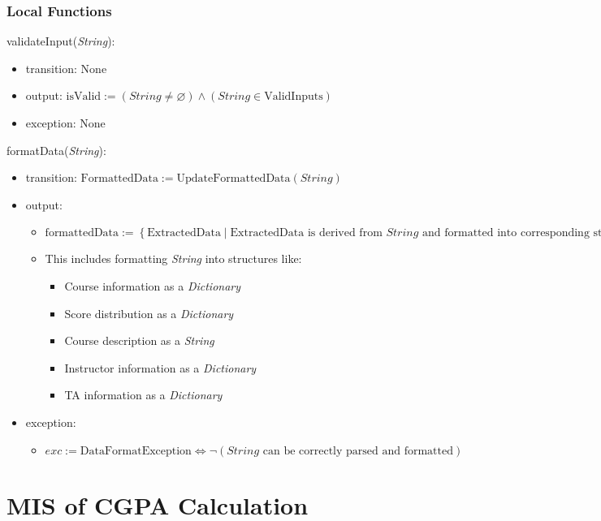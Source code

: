 \documentclass[12pt, titlepage]{article}
\begin{document}
\begin{itemize}
\subsubsection{Local Functions}

\noindent validateInput(\textit{String}):
\begin{itemize}
\item transition: None
\item output: \( \text{isValid} := (\textit{String} \neq \varnothing) \land (\textit{String} \in \text{ValidInputs}) \)
\item exception: None
\end{itemize}

\noindent formatData(\textit{String}):
\begin{itemize}
\item transition: \( \text{FormattedData} := \text{UpdateFormattedData}(\textit{String}) \)
\item output: 
    \begin{itemize}
        \item \( \text{formattedData} := \left\{ \text{ExtractedData} \mid \text{ExtractedData} \text{ is derived from } \textit{String} \text{ and formatted into corresponding structures} \right\} \)
        \item This includes formatting \textit{String} into structures like:
            \begin{itemize}
                \item Course information as a \textit{Dictionary}
                \item Score distribution as a \textit{Dictionary}
                \item Course description as a \textit{String}
                \item Instructor information as a \textit{Dictionary}
                \item TA information as a \textit{Dictionary}
            \end{itemize}
    \end{itemize}
\item exception: 
    \begin{itemize}
        \item \( exc := \text{DataFormatException} \iff \lnot (\textit{String} \text{ can be correctly parsed and formatted}) \)
    \end{itemize}
\end{itemize}

\newpage
\section{MIS of CGPA Calculation} \label{CGPACalculationModule}


\end{itemize}
\end{document}
